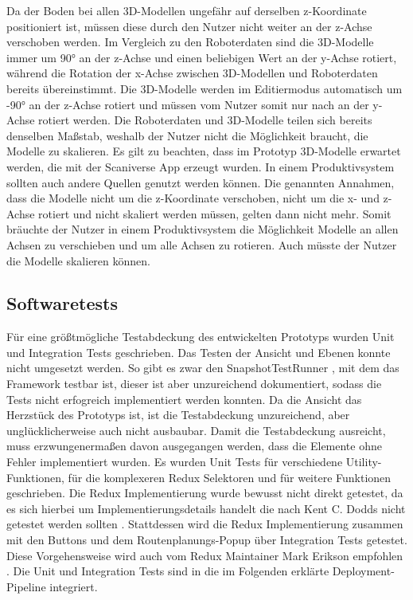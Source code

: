 Da der Boden bei allen 3D-Modellen ungefähr auf derselben z-Koordinate positioniert ist, müssen diese durch den Nutzer nicht weiter an der z-Achse verschoben werden. Im Vergleich zu den Roboterdaten sind die 3D-Modelle immer um 90° an der z-Achse und einen beliebigen Wert an der y-Achse rotiert, während die Rotation der x-Achse zwischen 3D-Modellen und Roboterdaten bereits übereinstimmt. Die 3D-Modelle werden im Editiermodus automatisch um -90° an der z-Achse rotiert und müssen vom Nutzer somit nur nach an der y-Achse rotiert werden. Die Roboterdaten und 3D-Modelle teilen sich bereits denselben Maßstab, weshalb der Nutzer nicht die Möglichkeit braucht, die Modelle zu skalieren. Es gilt zu beachten, dass im Prototyp 3D-Modelle erwartet werden, die mit der Scaniverse App erzeugt wurden. In einem Produktivsystem sollten auch andere Quellen genutzt werden können. Die genannten Annahmen, dass die Modelle nicht um die z-Koordinate verschoben, nicht um die x- und z-Achse rotiert und nicht skaliert werden müssen, gelten dann nicht mehr. Somit bräuchte der Nutzer in einem Produktivsystem die Möglichkeit Modelle an allen Achsen zu verschieben und um alle Achsen zu rotieren. Auch müsste der Nutzer die Modelle skalieren können.

\subsection{Softwaretests}
Für eine größtmögliche Testabdeckung des entwickelten Prototyps wurden Unit und Integration Tests geschrieben. Das Testen der \deckgl{} Ansicht und Ebenen konnte nicht umgesetzt werden. So gibt es zwar den SnapshotTestRunner \cite{DeckglSnapshotTestRunner}, mit dem das Framework testbar ist, dieser ist aber unzureichend dokumentiert, sodass die Tests nicht erfogreich implementiert werden konnten. Da die \deckgl{} Ansicht das Herzstück des Prototyps ist, ist die Testabdeckung unzureichend, aber unglücklicherweise auch nicht ausbaubar. Damit die Testabdeckung ausreicht, muss erzwungenermaßen davon ausgegangen werden, dass die \deckgl{} Elemente ohne Fehler implementiert wurden. Es wurden Unit Tests für verschiedene Utility-Funktionen, für die komplexeren Redux Selektoren und für weitere Funktionen geschrieben. Die Redux Implementierung wurde bewusst nicht direkt getestet, da es sich hierbei um Implementierungsdetails handelt die nach Kent C. Dodds nicht getestet werden sollten \cite{Dodds}. Stattdessen wird die Redux Implementierung zusammen mit den Buttons und dem Routenplanungs-Popup über Integration Tests getestet. Diese Vorgehensweise wird auch vom Redux Maintainer Mark Erikson empfohlen \cite{Erikson}. Die Unit und Integration Tests sind in die im Folgenden erklärte Deployment-Pipeline integriert.

